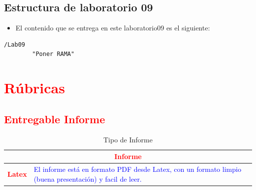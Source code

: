 \documentclass{article}
\begin{document}
	\subsection{Estructura de laboratorio 09}
	\begin{itemize}	
		\item El contenido que se entrega en este laboratorio09 es el siguiente:
	\end{itemize}
	\begin{lstlisting}[style=ascii-tree]
	/Lab09	
		"Poner RAMA"

	\end{lstlisting}    
	\section{\textcolor{red}{Rúbricas}}
	
	\subsection{\textcolor{red}{Entregable Informe}}
	\begin{table}[H]
		\caption{Tipo de Informe}
		\setlength{\tabcolsep}{0.5em} %
		{\renewcommand{\arraystretch}{1.5}%
		\begin{tabular}{|p{3cm}|p{12cm}|}
			\hline
			\multicolumn{2}{|c|}{\textbf{\textcolor{red}{Informe}}}  \\
			\hline 
			\textbf{\textcolor{red}{Latex}} & \textcolor{blue}{El informe está en formato PDF desde Latex,  con un formato limpio (buena presentación) y facil de leer.}   \\ 
			\hline 
			
			
		\end{tabular}
	}
	\end{table}
	
	\clearpage
	
\end{document}
